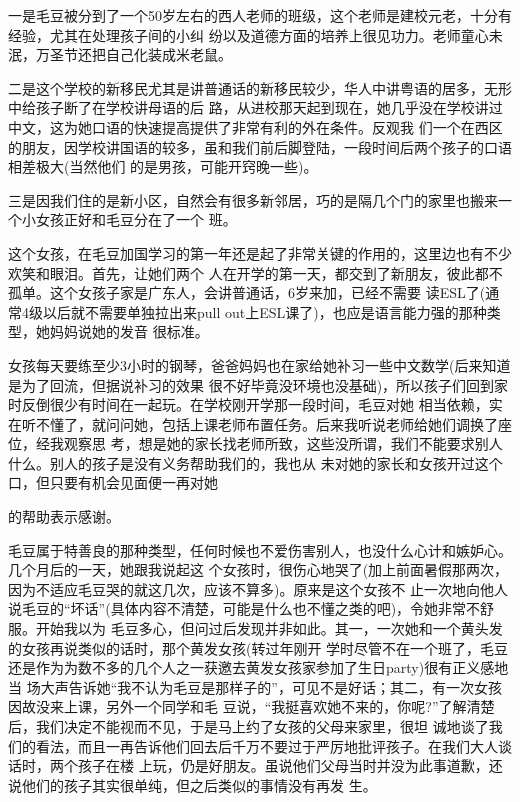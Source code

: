 \documentclass[11pt,a4paper,onecolumn]{article}
\begin{document}
一是毛豆被分到了一个50岁左右的西人老师的班级，这个老师是建校元老，十分有经验，尤其在处理孩子间的小纠
纷以及道德方面的培养上很见功力。老师童心未泯，万圣节还把自己化装成米老鼠。

二是这个学校的新移民尤其是讲普通话的新移民较少，华人中讲粤语的居多，无形中给孩子断了在学校讲母语的后
路，从进校那天起到现在，她几乎没在学校讲过中文，这为她口语的快速提高提供了非常有利的外在条件。反观我
们一个在西区的朋友，因学校讲国语的较多，虽和我们前后脚登陆，一段时间后两个孩子的口语相差极大(当然他们
的是男孩，可能开窍晚一些)。

三是因我们住的是新小区，自然会有很多新邻居，巧的是隔几个门的家里也搬来一个小女孩正好和毛豆分在了一个
班。

这个女孩，在毛豆加国学习的第一年还是起了非常关键的作用的，这里边也有不少欢笑和眼泪。首先，让她们两个
人在开学的第一天，都交到了新朋友，彼此都不孤单。这个女孩子家是广东人，会讲普通话，6岁来加，已经不需要
读ESL了(通常4级以后就不需要单独拉出来pull out上ESL课了)，也应是语言能力强的那种类型，她妈妈说她的发音
很标准。

女孩每天要练至少3小时的钢琴，爸爸妈妈也在家给她补习一些中文数学(后来知道是为了回流，但据说补习的效果
很不好毕竟没环境也没基础)，所以孩子们回到家时反倒很少有时间在一起玩。在学校刚开学那一段时间，毛豆对她
相当依赖，实在听不懂了，就问问她，包括上课老师布置任务。后来我听说老师给她们调换了座位，经我观察思
考，想是她的家长找老师所致，这些没所谓，我们不能要求别人什么。别人的孩子是没有义务帮助我们的，我也从
未对她的家长和女孩开过这个口，但只要有机会见面便一再对她

的帮助表示感谢。

毛豆属于特善良的那种类型，任何时候也不爱伤害别人，也没什么心计和嫉妒心。几个月后的一天，她跟我说起这
个女孩时，很伤心地哭了(加上前面暑假那两次，因为不适应毛豆哭的就这几次，应该不算多)。原来是这个女孩不
止一次地向他人说毛豆的``坏话''(具体内容不清楚，可能是什么也不懂之类的吧)，令她非常不舒服。开始我以为
毛豆多心，但问过后发现并非如此。其一，一次她和一个黄头发的女孩再说类似的话时，那个黄发女孩(转过年刚开
学时尽管不在一个班了，毛豆还是作为为数不多的几个人之一获邀去黄发女孩家参加了生日party)很有正义感地当
场大声告诉她``我不认为毛豆是那样子的''，可见不是好话；其二，有一次女孩因故没来上课，另外一个同学和毛
豆说，``我挺喜欢她不来的，你呢?''了解清楚后，我们决定不能视而不见，于是马上约了女孩的父母来家里，很坦
诚地谈了我们的看法，而且一再告诉他们回去后千万不要过于严厉地批评孩子。在我们大人谈话时，两个孩子在楼
上玩，仍是好朋友。虽说他们父母当时并没为此事道歉，还说他们的孩子其实很单纯，但之后类似的事情没有再发
生。
\end{document}
